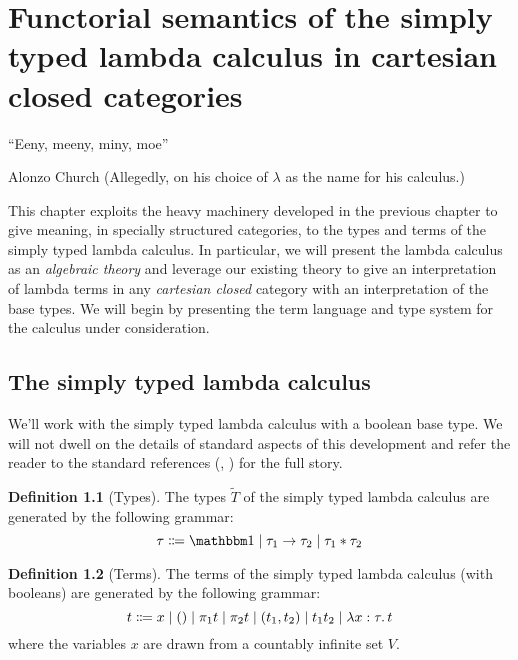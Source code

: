 \documentclass[12pt,twoside]{reedthesis}
\theoremstyle{definition}
\newtheorem{definition}{Definition}
\theoremstyle{remark}
\theoremstyle{plain}
\begin{document}
\chapter{Functorial semantics of the simply typed lambda calculus in cartesian closed categories}
\epigraph{``Eeny, meeny, miny, moe''}{Alonzo Church (Allegedly, on his choice of
  $\lambda$ as the name for his calculus.)}

This chapter exploits the heavy machinery developed in the previous chapter to
give meaning, in specially structured categories, to the types and terms of the
simply typed lambda calculus. In particular, we will present the lambda calculus
as an \emph{algebraic theory} and leverage our existing theory to give an
interpretation of lambda terms in any \emph{cartesian closed} category with an
interpretation of the base types. We will begin by presenting the term language
and type system for the calculus under consideration.

\section{The simply typed lambda calculus}
We'll work with the simply typed lambda calculus with a boolean base type. We
will not dwell on the details of standard aspects of this development and refer
the reader to the standard references (\cite{pierce_types_2002},
\cite{harper_practical_2016}) for the full story.


\begin{definition}[Types]\label{def:stlc_types}
  The types \( \widetilde{T} \) of the simply typed lambda calculus are
  generated by the following grammar:
  \[
    \tau \Coloneqq \termob \mid \tau_{1} \rightarrow \tau_{2} \mid \tau_{1} * \tau_{2}
  \]
\end{definition}

\begin{definition}[Terms]
  The terms of the simply typed lambda calculus (with booleans) are generated by the
  following grammar:
  \[
    t \Coloneq x \mid () \mid \pi_{1} t \mid \pi_{2} t \mid (t_{1}, t_{2}) \mid t_{1} t_{2} \mid \abstr{x}{\tau}{t}
  \]
  where the variables $x$ are drawn from a countably infinite set \( V \).
\end{definition}
\end{document}
